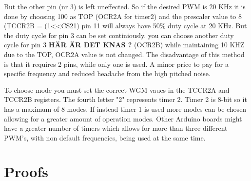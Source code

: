 \documentclass[a4paper,11pt]{kth-mag}
\begin{document}
But the other pin (nr 3) is left uneffected. So if the desired PWM is 20 KHz it is done by choosing 100 
as TOP (OCR2A for timer2) and the prescaler value to 8 (TCCR2B = (1<<CS21) pin 11 will always have 50\% duty cycle at 20 KHz. But the duty cycle for pin 3 can be set continiously.  you can choose another duty cycle for pin 3  \textbf{HÄR ÄR DET KNAS ?}
(OCR2B) while maintaining 10 KHZ due to the TOP, OCR2A value is not changed. The disadvantage of this method is that it requires 2 pins, while only one is used. A minor price to pay for a specific frequency and reduced headache from the high pitched noise.

To choose mode you must set the correct WGM vaues in the TCCR2A and TCCR2B registers. The fourth letter "2" represents timer 2. Timer 2 is 8-bit so it has a maximum of 8 modes. If instead timer 1 is 
used more modes can be chosen allowing for a greater amount of operation modes. Other Arduino boards might have a greater number of timers which allows for more than three different PWM's, with non default frequencies, being used at the same time.

\chapter{Proofs} \label{appB}

\cleardoublepage   
\cleartoverso %
%

\end{document}
